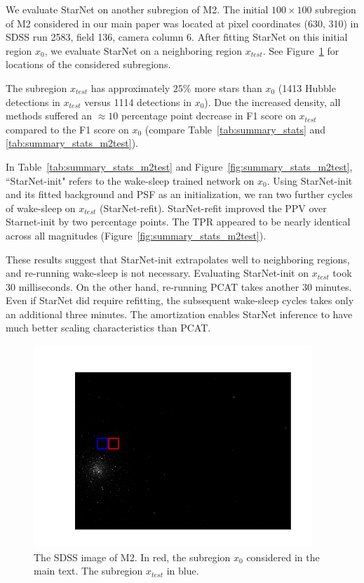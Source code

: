 We evaluate StarNet on another subregion of M2.
The initial $100\times100$ subregion of M2 considered in our main paper was located at pixel coordinates (630, 310) in SDSS run 2583, field 136, camera column 6. 
After fitting StarNet on this initial region $x_0$, we evaluate StarNet on a neighboring region $x_{test}$. See Figure~\ref{fig:marked_m2} for locations of the considered subregions. 

The subregion $x_{test}$ has approximately $25\%$ more stars than $x_0$ (1413 Hubble detections in $x_{test}$ versus 1114 detections in $x_0$). 
Due the increased density, all methods suffered an $\approx10$ percentage point decrease in F1 score on $x_{test}$ compared to the F1 score on $x_0$ (compare Table~\ref{tab:summary_stats} and \ref{tab:summary_stats_m2test}). 



In Table~\ref{tab:summary_stats_m2test} and Figure~\ref{fig:summary_stats_m2test},
``StarNet-init" refers to the wake-sleep trained network on $x_0$. 
Using StarNet-init and its fitted background and PSF as an initialization, we ran two further cycles of wake-sleep on $x_{test}$ (StarNet-refit). 
StarNet-refit improved the PPV over Starnet-init by two percentage points. 
The TPR appeared to be nearly identical across all magnitudes (Figure~\ref{fig:summary_stats_m2test}). 

These results suggest that StarNet-init extrapolates well to neighboring regions, and re-running wake-sleep is not necessary. 
Evaluating StarNet-init on $x_{test}$ took 30 milliseconds. 
On the other hand, re-running PCAT takes another 30 minutes. 
Even if StarNet did require refitting, the subsequent wake-sleep cycles takes only an additional three minutes. 
The amortization enables StarNet inference to have much better scaling characteristics than PCAT. 

\begin{figure}[!ht]
    \centering
    \includegraphics{figures/m2_test/m2_regions.png}
    \caption{The SDSS image of M2. In red, the subregion $x_0$ considered in the main text. The subregion $x_{test}$ in blue. }
    \label{fig:marked_m2}
\end{figure}

